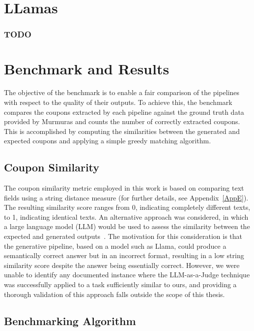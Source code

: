 \documentclass[licencjacka,en]{pracamgr}
\begin{document}
\chapter{LLamas}
\subsection{TODO}

\chapter{Benchmark and Results}

The objective of the benchmark is to enable a fair comparison of the pipelines with respect to the quality of their outputs. To achieve this, the benchmark compares the coupons extracted by each pipeline against the ground truth data provided by Murmuras and counts the number of correctly extracted coupons. This is accomplished by computing the similarities between the generated and expected coupons and applying a simple greedy matching algorithm.

\section{Coupon Similarity}

The coupon similarity metric employed in this work is based on comparing text fields using a string distance measure (for further details, see Appendix~\ref{AppE}). The resulting similarity score ranges from 0, indicating completely different texts, to 1, indicating identical texts. An alternative approach was considered, in which a large language model (LLM) would be used to assess the similarity between the expected and generated outputs~\cite{llm-as-a-judge}. The motivation for this consideration is that the generative pipeline, based on a model such as Llama, could produce a semantically correct answer but in an incorrect format, resulting in a low string similarity score despite the answer being essentially correct. However, we were unable to identify any documented instance where the LLM-as-a-Judge technique was successfully applied to a task sufficiently similar to ours, and providing a thorough validation of this approach falls outside the scope of this thesis.

\section{Benchmarking Algorithm}
\end{document}
